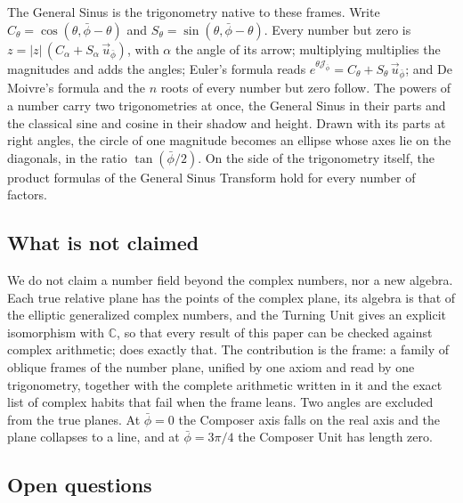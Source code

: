\documentclass[11pt,a4paper]{amsart}
\theoremstyle{plain}
\theoremstyle{definition}
\theoremstyle{remark}
\newcommand{\pb}{\bar{\phi}}                     %
\newcommand{\up}{\vec{u}_{\bar{\phi}}}           %
\newcommand{\Jp}{\mathcal{J}_{\bar{\phi}}}       %
\newcommand{\C}{\mathbb{C}}
\begin{document}
The General Sinus is the trigonometry native to these frames. Write $C_\theta = \cos(\theta, \pb - \theta)$ and $S_\theta = \sin(\theta, \pb - \theta)$. Every number but zero is $z = \lvert z\rvert\,(C_\alpha + S_\alpha\,\up)$, with $\alpha$ the angle of its arrow; multiplying multiplies the magnitudes and adds the angles; Euler's formula reads $e^{\theta\Jp} = C_\theta + S_\theta\,\up$; and De Moivre's formula and the $n$ roots of every number but zero follow. The powers of a number carry two trigonometries at once, the General Sinus in their parts and the classical sine and cosine in their shadow and height. Drawn with its parts at right angles, the circle of one magnitude becomes an ellipse whose axes lie on the diagonals, in the ratio $\tan(\pb/2)$. On the side of the trigonometry itself, the product formulas of the General Sinus Transform hold for every number of factors.

\subsection{What is not claimed}

We do not claim a number field beyond the complex numbers, nor a new algebra. Each true relative plane has the points of the complex plane, its algebra is that of the elliptic generalized complex numbers, and the Turning Unit gives an explicit isomorphism with $\C$, so that every result of this paper can be checked against complex arithmetic;  does exactly that. The contribution is the frame: a family of oblique frames of the number plane, unified by one axiom and read by one trigonometry, together with the complete arithmetic written in it and the exact list of complex habits that fail when the frame leans. Two angles are excluded from the true planes. At $\pb = 0$ the Composer axis falls on the real axis and the plane collapses to a line, and at $\pb = 3\pi/4$ the Composer Unit has length zero.

\subsection{Open questions}
\end{document}
